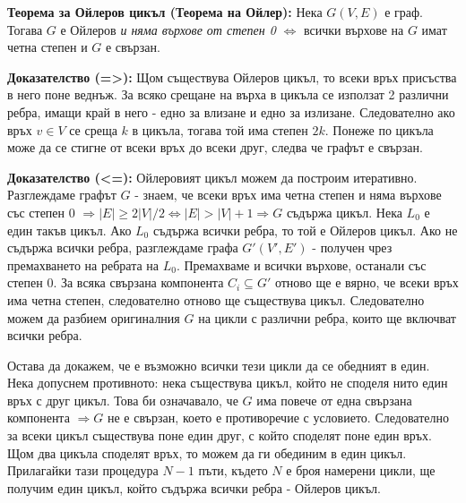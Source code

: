 \documentclass[fleqn,12pt]{article}
\begin{document}
\begin{flushleft}
\textbf{Теорема за Ойлеров цикъл (Теорема на Ойлер): } Нека $G(V,E)$ е граф. Тогава $G$ е Ойлеров \textit{и няма върхове от степен 0} $\Leftrightarrow$
всички върхове на $G$ имат четна степен и $G$ е свързан.

\textbf{Доказателство (=>): } Щом съществува Ойлеров цикъл, то всеки връх присъства в него поне веднъж.
За всяко срещане на върха в цикъла се използат 2 различни ребра, имащи край в него - едно за влизане и едно за излизане.
Следователно ако връх $v \in V$ се среща $k$ в цикъла, тогава той има степен $2k$. Понеже по цикъла може да се стигне от
всеки връх до всеки друг, следва че графът е свързан.
\vspace{10mm}

\textbf{Доказателство (<=): } Ойлеровият цикъл можем да построим итеративно. Разглеждаме графът $G$ - знаем, че всеки връх има четна степен и
няма върхове със степен 0 $\Rightarrow |E| \geq 2 |V| / 2 \Leftrightarrow |E| > |V| + 1 \Rightarrow G$ съдържа цикъл.  
Нека $L_0$ е един такъв цикъл. Ако $L_0$ съдържа всички ребра, то той е Ойлеров цикъл. 
Ако не съдържа всички ребра, разглеждаме графа $G'(V', E')$ - получен чрез премахването на ребрата на $L_0$. 
Премахваме и всички върхове, останали със степен 0. За всяка свързана компонента $C_i \subseteq G'$ отново ще е вярно,
че всеки връх има четна степен, следователно отново ще съществува цикъл. Следователно можем да разбием оригиналния
$G$ на цикли с различни ребра, които ще включват всички ребра. 

Остава да докажем, че е възможно всички тези цикли да се обедният в един. Нека допуснем противното: нека съществува цикъл,
който не споделя нито един връх с друг цикъл. Това би означавало, че $G$ има повече от една свързана компонента 
$\Rightarrow G$ не е свързан, което е противоречие с условието. Следователно за всеки цикъл съществува поне един друг,
с който споделят поне един връх. Щом два цикъла споделят връх, то можем да ги обединим в един цикъл. Прилагайки тази процедура
$N - 1$ пъти, където $N$ е броя намерени цикли, ще получим един цикъл, който съдържа всички ребра - Ойлеров цикъл. 
 
\end{flushleft}
\end{document}
